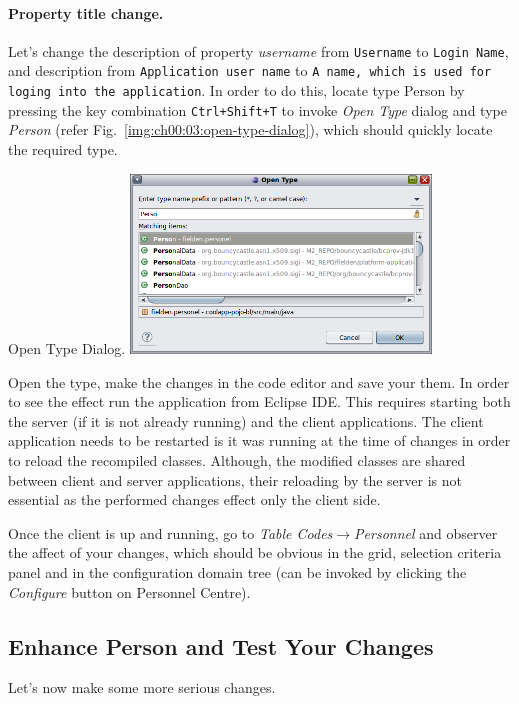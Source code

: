   \paragraph*{Property title change.}
  Let's change the description of property \emph{username} from \texttt{Username} to \texttt{Login Name}, and description from \texttt{Application user name} to \texttt{A name, which is used for loging into the application}.
  In order to do this, locate type Person by pressing the key combination \texttt{Ctrl+Shift+T} to invoke \emph{Open Type} dialog and type \emph{Person} (refer Fig.~\ref{img:ch00:03:open-type-dialog}), which should quickly locate the required type.

  \begin{image}{Open Type Dialog.}{\label{img:ch00:03:open-type-dialog}}
    \includegraphics[width=0.6\textwidth]{parts/00-part/chapters/02-making-changes/images/01-open-type-person.png}
  \end{image}

  Open the type, make the changes in the code editor and save your them.
  In order to see the effect run the application from Eclipse IDE.
  This requires starting both the server (if it is not already running) and the client applications.
  The client application needs to be restarted is it was running at the time of changes in order to reload the recompiled classes.
  Although, the modified classes are shared between client and server applications, their reloading by the server is not essential as the performed changes effect only the client side.
  
  Once the client is up and running, go to \emph{Table Codes}$\longrightarrow$\emph{Personnel} and observer the affect of your changes, which should be obvious in the grid, selection criteria panel and in the configuration domain tree (can be invoked by clicking the \emph{Configure} button on Personnel Centre).
  
\subsection{Enhance Person and Test Your Changes}\label{ch00:03:the-scenario}
  Let's now make some more serious changes. 
  

